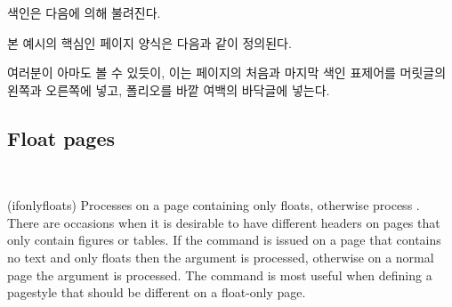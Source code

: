 색인은 다음에 의해 불려진다.
\begin{lcode}
\clearpage
\pagestyle{index}
\renewcommand{\preindexhook}{%
The first page number is usually, but not always, 
the primary reference to
the indexed topic.\vskip\onelineskip}
\printindex
\end{lcode}


본 예시의 핵심인  페이지 양식은 다음과 같이 정의된다.
\begin{lcode}
\end{lcode}
여러분이 아마도 볼 수 있듯이, 이는 페이지의 처음과 마지막
색인 표제어를 머릿글의 왼쪽과 오른쪽에
넣고, 폴리오를 바깥 여백의
바닥글에 넣는다.


\subsection{Float pages}


\begin{syntax}
 \\
\end{syntax}
\glossary(ifonlyfloats)%
  {}%
  {Processes  on a page containing only floats, otherwise process
  .}
    There are occasions when it is desirable to have different 
headers on pages that only contain figures 
or tables. If the command 
is issued on a page that contains no text and only floats then the 
argument is processed, otherwise on a normal page the  argument
is processed. The command is most useful when defining a pagestyle that 
should be different on a float-only page.

